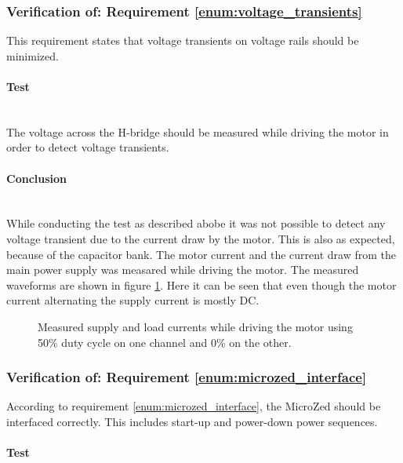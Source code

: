 \subsubsection{Verification of: Requirement \ref{enum:voltage_transients}} %
\label{ssub:requirement_enum:voltage_transients}
This requirement states that voltage transients on voltage rails should be minimized.

\paragraph{Test}~\\
The voltage across the H-bridge should be measured while driving the motor in order to detect voltage transients. 

\paragraph{Conclusion}~\\
While conducting the test as described abobe it was not possible to detect any voltage transient due to the current draw by the motor.
This is also as expected, because of the capacitor bank.
The motor current and the current draw from the main power supply was measared while driving the motor.
The measured waveforms are shown in figure \ref{fig:controllerboardv2_currents}.
Here it can be seen that even though the motor current alternating the supply current is mostly DC.
\begin{figure}[h]
	\centering
	\caption[Measured supply and load currents.]{Measured supply and load currents while driving the motor using 50\% duty cycle on one channel and 0\% on the other.}
	\label{fig:controllerboardv2_currents}
\end{figure}

\subsubsection{Verification of: Requirement \ref{enum:microzed_interface}} %
\label{ssub:requirement_enum:microzed_interface}
According to requirement  \ref{enum:microzed_interface}, the MicroZed should be interfaced correctly. 
This includes start-up and power-down power sequences.

\paragraph{Test}~\\

